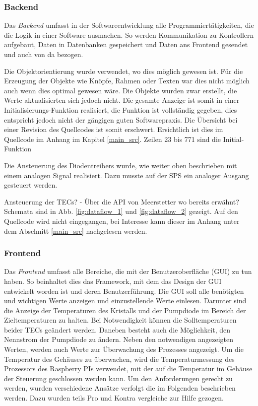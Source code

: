 \subsubsection{Backend}
\label{chptr:software_backend}
Das \textit{Backend} umfasst in der Softwareentwicklung alle Programmiertätigkeiten, die die Logik in einer Software ausmachen. So werden Kommunikation zu Kontrollern aufgebaut, Daten in Datenbanken gespeichert und Daten ans Frontend gesendet und auch von da bezogen.

Die Objektorientierung wurde verwendet, wo dies möglich gewesen ist. Für die Erzeugung der Objekte wie Knöpfe, Rahmen oder Texten war dies nicht möglich auch wenn dies optimal gewesen wäre. Die Objekte wurden zwar erstellt, die Werte aktualisierten sich jedoch nicht. Die gesamte Anzeige ist somit in einer Initialisierungs-Funktion realisiert, die Funktion ist vollständig gegeben, dies entspricht jedoch nicht der gängigen guten Softwarepraxis. Die Übersicht bei einer Revision des Quellcodes ist somit erschwert. Ersichtlich ist dies im Quellcode im Anhang im Kapitel \ref{main_src}. Zeilen 23 bis 771 sind die Initial-Funktion

Die Ansteuerung des Diodentreibers wurde, wie weiter oben beschrieben mit einem analogen Signal realisiert. Dazu musste auf der SPS ein analoger Ausgang gesteuert werden.

Ansteuerung der TECs? - Über die API von Meerstetter wo bereits erwähnt?
Schemata sind in Abb. \ref{fig:dataflow_1} und \ref{fig:dataflow_2} gezeigt. Auf den Quellcode wird nicht eingegangen, bei Interesse kann dieser im Anhang unter dem Abschnitt \ref{main_src} nachgelesen werden.

\subsubsection{Frontend}
Das \textit{Frontend} umfasst alle Bereiche, die mit der Benutzeroberfläche (GUI) zu tun haben. So beinhaltet dies das Framework, mit dem das Design der GUI entwickelt worden ist und deren Benutzerführung. 
Die GUI soll alle benötigten und wichtigen Werte anzeigen und einzustellende Werte einlesen. Darunter sind die Anzeige der Temperaturen des Kristalls und der Pumpdiode im Bereich der Zieltemperaturen zu halten. Bei Notwendigkeit können die Solltemperaturen beider TECs geändert werden. Daneben besteht auch die Möglichkeit, den Nennstrom der Pumpdiode zu ändern. Neben den notwendigen angezeigten Werten, werden auch Werte zur Überwachung des Prozesses angezeigt. Um die Temperatur des Gehäuses zu überwachen, wird die Temperaturmessung des Prozessors des Raspberry PIs verwendet, mit der auf die Temperatur im Gehäuse der Steuerung geschlossen werden kann. Um den Anforderungen gerecht zu werden, wurden verschiedene Ansätze verfolgt die im Folgenden beschrieben werden. Dazu wurden teils Pro und Kontra vergleiche zur Hilfe gezogen.\\

